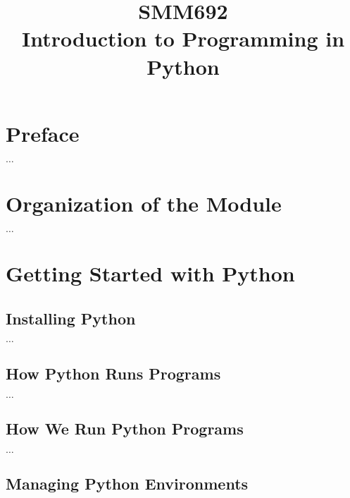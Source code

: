 \documentclass[a4paper,11pt]{book}
\title{%
        \begin{tcolorbox}[before skip = \baselineskip, after skip =-\baselineskip]
            \centering\Huge\sffamily SMM692\\ Introduction to Programming in Python 
        \end{tcolorbox}
}
\date{}
\numberwithin{figure}{chapter}
\numberwithin{table}{chapter}
\begin{document}
    
\maketitle  

\clearpage

\tableofcontents

\listoffigures

\listoftables

\clearpage

\chapter*{Preface}

$\ldots$

\chapter{Organization of the Module}


\vspace{1em}


\vspace{1em}

$\ldots$

\chapter{Getting Started with Python}


\vspace{1em}


\vspace{1em}

\section{Installing Python}

$\ldots$

\section{How Python Runs Programs}

$\ldots$

\section{How We Run Python Programs}

$\ldots$

\section{Managing Python Environments}
\end{document}
